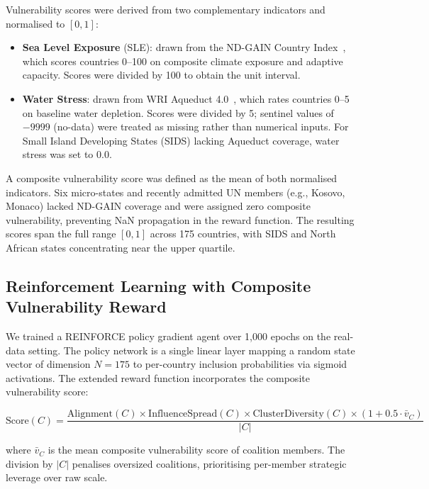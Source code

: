 \documentclass[11pt]{article}
\begin{document}
Vulnerability scores were derived from two complementary indicators and normalised to $[0,1]$:
\begin{itemize}
    \item \textbf{Sea Level Exposure} (SLE): drawn from the ND-GAIN Country Index~\cite{ndgain}, which scores countries 0--100 on composite climate exposure and adaptive capacity. Scores were divided by 100 to obtain the unit interval.
    \item \textbf{Water Stress}: drawn from WRI Aqueduct 4.0~\cite{aqueduct}, which rates countries 0--5 on baseline water depletion. Scores were divided by 5; sentinel values of $-9999$ (no-data) were treated as missing rather than numerical inputs. For Small Island Developing States (SIDS) lacking Aqueduct coverage, water stress was set to 0.0.
\end{itemize}

A composite vulnerability score was defined as the mean of both normalised indicators. Six micro-states and recently admitted UN members (e.g., Kosovo, Monaco) lacked ND-GAIN coverage and were assigned zero composite vulnerability, preventing NaN propagation in the reward function. The resulting scores span the full range $[0, 1]$ across 175 countries, with SIDS and North African states concentrating near the upper quartile.

\subsection{Reinforcement Learning with Composite Vulnerability Reward}
\label{sec:results_rl}

We trained a REINFORCE policy gradient agent over 1{,}000 epochs on the real-data setting. The policy network is a single linear layer mapping a random state vector of dimension $N=175$ to per-country inclusion probabilities via sigmoid activations. The extended reward function incorporates the composite vulnerability score:

\begin{equation}
    \text{Score}(C) = \frac{\text{Alignment}(C) \times \text{InfluenceSpread}(C) \times \text{ClusterDiversity}(C) \times \left(1 + 0.5 \cdot \bar{v}_C\right)}{|C|}
    \label{eq:reward_realdata}
\end{equation}

where $\bar{v}_C$ is the mean composite vulnerability score of coalition members. The division by $|C|$ penalises oversized coalitions, prioritising per-member strategic leverage over raw scale.
\end{document}

